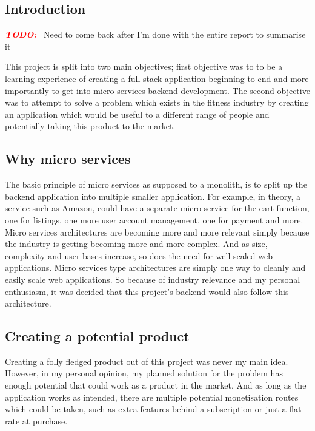\documentclass{article}
\newcommand{\vspaceconst}{-2ex}
\newcommand{\TODO}{\textbf{\textit{\textcolor{red}{TODO:}}} }
\begin{document}
\begin{multicols}{2}
\section{Introduction}
\vspace{\vspaceconst}

\TODO~Need to come back after I'm done with the entire report to summarise it

This project is split into two main objectives; first objective was to to be a learning experience of creating a full stack application beginning to end and more importantly to get into micro services backend development. The second objective was to attempt to solve a problem which exists in the fitness industry by creating an application which would be useful to a different range of people and potentially taking this product to the market.


\subsection{Why micro services}
\vspace{\vspaceconst}

The basic principle of micro services as supposed to a monolith, is to split up the backend application into multiple smaller application. For example, in theory, a service such as Amazon, could have a separate micro service for the cart function, one for listings, one more user account management, one for payment and more.
Micro services architectures are becoming more and more relevant simply because the industry is getting becoming more and more complex. And as size, complexity and user bases increase, so does the need for well scaled web applications. Micro services type architectures are simply one way to cleanly and easily scale web applications. So because of industry relevance and my personal enthusiasm, it was decided that this project's backend would also follow this architecture. 

\subsection{Creating a potential product}
\vspace{\vspaceconst}

Creating a folly fledged product out of this project was never my main idea. However, in my personal opinion, my planned solution for the problem has enough potential that could work as a product in the market. And as long as the application works as intended, there are multiple potential monetisation routes which could be taken, such as extra features behind a subscription or just a flat rate at purchase.


\end{multicols}
\end{document}
